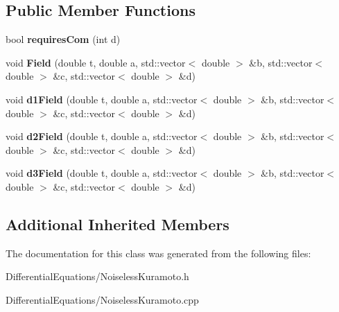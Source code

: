 \subsection*{Public Member Functions}
\begin{DoxyCompactItemize}
\item 
\mbox{\label{classNoiselessKuramoto_a895541b3102a4a4326b31b6959d9557c}} 
bool {\bfseries requires\+Com} (int d)
\item 
\mbox{\label{classNoiselessKuramoto_ab84a5e300d32b083f66c1cc30ae8ce85}} 
void {\bfseries Field} (double t, double a, std\+::vector$<$ double $>$ \&b, std\+::vector$<$ double $>$ \&c, std\+::vector$<$ double $>$ \&d)
\item 
\mbox{\label{classNoiselessKuramoto_ac53fc879e5b203dac98116a35075472b}} 
void {\bfseries d1\+Field} (double t, double a, std\+::vector$<$ double $>$ \&b, std\+::vector$<$ double $>$ \&c, std\+::vector$<$ double $>$ \&d)
\item 
\mbox{\label{classNoiselessKuramoto_a530a81415bfd4b425d03036c568a75ff}} 
void {\bfseries d2\+Field} (double t, double a, std\+::vector$<$ double $>$ \&b, std\+::vector$<$ double $>$ \&c, std\+::vector$<$ double $>$ \&d)
\item 
\mbox{\label{classNoiselessKuramoto_a6bec0fd694070e867d3956721d235471}} 
void {\bfseries d3\+Field} (double t, double a, std\+::vector$<$ double $>$ \&b, std\+::vector$<$ double $>$ \&c, std\+::vector$<$ double $>$ \&d)
\end{DoxyCompactItemize}
\subsection*{Additional Inherited Members}


The documentation for this class was generated from the following files\+:\begin{DoxyCompactItemize}
\item 
Differential\+Equations/Noiseless\+Kuramoto.\+h\item 
Differential\+Equations/Noiseless\+Kuramoto.\+cpp\end{DoxyCompactItemize}
